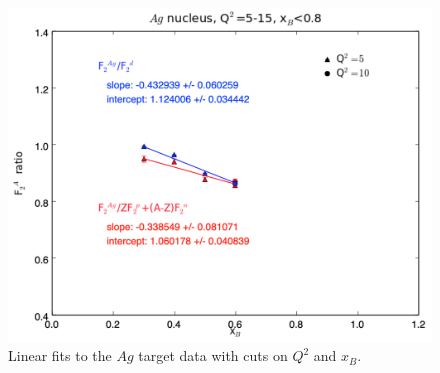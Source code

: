 \documentclass[oneside]{article}
\begin{document}
\begin{figure}[H]
\begin{minipage}{0.5\textwidth}
\includegraphics[width=\textwidth]{plots/q2_all_x_all/all_Ag.png}
\end{minipage}
  \caption[]{Linear fits to the $Ag$ target data with cuts on $Q^2$ and $x_B$.}
  \label{fig:fits_Ag}
\end{figure}   
\end{document}
